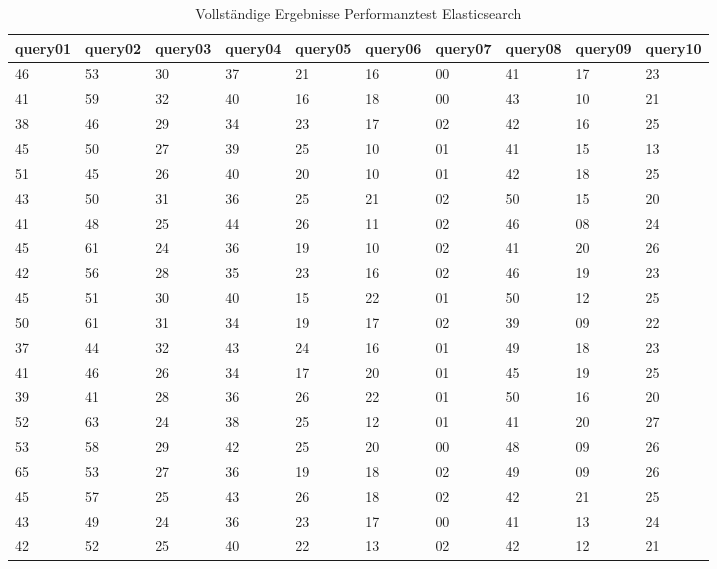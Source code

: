 \documentclass[a4paper]{scrartcl}
\begin{document}
\begin{table}[htb]
	\centering
	\caption{Vollständige Ergebnisse Performanztest Elasticsearch}
	\begin{adjustwidth}{-2cm}{-2cm}
		
		\begin{tabular}{| l | l | l | l | l | l | l | l | l | l |}
			\hline
			query01 & query02 & query03 & query04 & query05 & query06 & query07 & query08 & query09 & query10 \\ [0.5ex]
			\hline \hline
			46 & 53 & 30 & 37 & 21 & 16 & 00 & 41 & 17 & 23 \\
			\hline
			41 & 59 & 32 & 40 & 16 & 18 & 00 & 43 & 10 & 21 \\
			\hline
			38 & 46 & 29 & 34 & 23 & 17 & 02 & 42 & 16 & 25 \\
			\hline
			45 & 50 & 27 & 39 & 25 & 10 & 01 & 41 & 15 & 13 \\
			\hline
			51 & 45 & 26 & 40 & 20 & 10 & 01 & 42 & 18 & 25 \\
			\hline
			43 & 50 & 31 & 36 & 25 & 21 & 02 & 50 & 15 & 20 \\
			\hline
			41 & 48 & 25 & 44 & 26 & 11 & 02 & 46 & 08 & 24 \\
			\hline
			45 & 61 & 24 & 36 & 19 & 10 & 02 & 41 & 20 & 26 \\
			\hline
			42 & 56 & 28 & 35 & 23 & 16 & 02 & 46 & 19 & 23 \\
			\hline
			45 & 51 & 30 & 40 & 15 & 22 & 01 & 50 & 12 & 25 \\
			\hline
			50 & 61 & 31 & 34 & 19 & 17 & 02 & 39 & 09 & 22 \\
			\hline
			37 & 44 & 32 & 43 & 24 & 16 & 01 & 49 & 18 & 23 \\
			\hline
			41 & 46 & 26 & 34 & 17 & 20 & 01 & 45 & 19 & 25 \\
			\hline
			39 & 41 & 28 & 36 & 26 & 22 & 01 & 50 & 16 & 20 \\
			\hline
			52 & 63 & 24 & 38 & 25 & 12 & 01 & 41 & 20 & 27 \\
			\hline
			53 & 58 & 29 & 42 & 25 & 20 & 00 & 48 & 09 & 26 \\
			\hline
			65 & 53 & 27 & 36 & 19 & 18 & 02 & 49 & 09 & 26 \\
			\hline
			45 & 57 & 25 & 43 & 26 & 18 & 02 & 42 & 21 & 25 \\
			\hline
			43 & 49 & 24 & 36 & 23 & 17 & 00 & 41 & 13 & 24 \\
			\hline
			42 & 52 & 25 & 40 & 22 & 13 & 02 & 42 & 12 & 21 \\

\end{tabular}
\end{adjustwidth}
\end{table}
\end{document}
